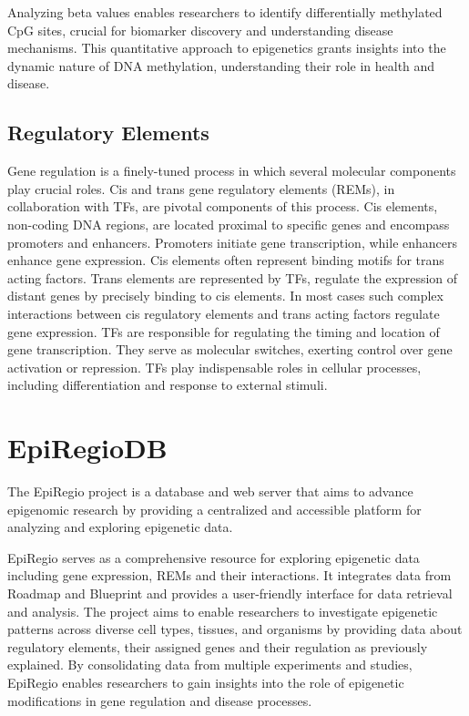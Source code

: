 \documentclass[pdftex,12pt,a4paper]{report}
\begin{document}
Analyzing beta values enables researchers to identify differentially methylated CpG sites, crucial for biomarker discovery and understanding disease mechanisms. This quantitative approach to epigenetics grants insights into the dynamic nature of DNA methylation, understanding their role in health and disease.
\subsection{Regulatory Elements}
Gene regulation is a finely-tuned process in which several molecular components play crucial roles. Cis and trans gene regulatory elements (REMs), in collaboration with TFs, are pivotal components of this process.
Cis elements, non-coding DNA regions, are located proximal to specific genes and encompass promoters and enhancers. Promoters initiate gene transcription, while enhancers enhance gene expression. Cis elements often represent binding motifs for trans acting factors\cite{rems_enhancers}.
Trans elements are represented by TFs, regulate the expression of distant genes by precisely binding to cis elements. In most cases such complex interactions between cis regulatory elements and trans acting factors regulate gene expression. TFs are responsible for regulating the timing and location of gene transcription\cite{rems_cis_trans}. They serve as molecular switches, exerting control over gene activation or repression. TFs play indispensable roles in cellular processes, including differentiation and response to external stimuli\cite{rems_enhancers}.

\section{EpiRegioDB}
The EpiRegio\cite{Epi} project is a database and web server that aims to advance
epigenomic research by providing a centralized and accessible platform for analyzing and
exploring epigenetic data. 

EpiRegio serves as a comprehensive resource for exploring epigenetic data including gene expression, REMs and their interactions. It integrates data from Roadmap\cite{roadmap} and Blueprint\cite{blueprint} and provides a user-friendly interface for data retrieval and analysis. The project aims to enable researchers to investigate epigenetic patterns across diverse cell types, tissues, and organisms by providing data about regulatory elements, their assigned genes and their regulation as previously explained. By consolidating data from multiple experiments and studies, EpiRegio enables researchers to gain insights into the role of epigenetic modifications in gene regulation and disease processes.
\end{document}
